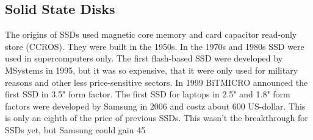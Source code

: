 \documentclass{acm_proc_article-sp}
\begin{document}
\subsection{Solid State Disks}
The origins of SSDs used magnetic core memory and card capacitor read-only store (CCROS). They were built in the 1950s. In the 1970s and 1980s SSD were used in supercomputers only. The first flash-based SSD were developed by MSystems in 1995, but it was so expensive, that it were only used for military reasons and other less price-sensitive sectors. In 1999 BiTMICRO announced the first SSD in 3.5" form factor. The first SSD for laptops in 2.5" and 1.8" form factors were developed by Samsung in 2006 and costz about 600 US-dollar. This is only an eighth of the price of previous SSDs. This wasn't the breakthrough for SSDs yet, but Samsung could gain 45%
\end{document}
